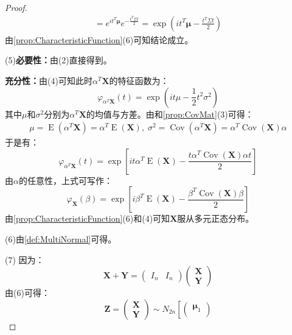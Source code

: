 \begin{proof}
\begin{align*}
		=e^{it^T\boldsymbol{\mu}}e^{-\frac{t^T\Sigma t}{2}}
		=\exp\left(it^T\boldsymbol{\mu}-\frac{t^T\Sigma t}{2}\right)
	\end{align*}
	由\cref{prop:CharacteristicFunction}(6)可知结论成立。\par
	(5)\textbf{必要性：}由(2)直接得到。\par
	\textbf{充分性：}由(4)可知此时$\alpha^T\mathbf{X}$的特征函数为：
	\begin{equation*}
		\varphi_{\alpha^T\mathbf{X}}(t)=\exp\left(it\mu-\frac{1}{2}t^2\sigma^2\right)
	\end{equation*}
	其中$\mu$和$\sigma^2$分别为$\alpha^T\mathbf{X}$的均值与方差。由和\cref{prop:CovMat}(3)可得：
	\begin{gather*}
		\mu=\operatorname{E}(\alpha^T\mathbf{X})=\alpha^T\operatorname{E}(\mathbf{X}),\;
		\sigma^2=\operatorname{Cov}(\alpha^T\mathbf{X})=\alpha^T\operatorname{Cov}(\mathbf{X})\alpha
	\end{gather*}
	于是有：
	\begin{equation*}
		\varphi_{\alpha^T\mathbf{X}}(t)=\exp\left[it\alpha^T\operatorname{E}(\mathbf{X})-\frac{t\alpha^T\operatorname{Cov}(\mathbf{X})\alpha t}{2}\right]
	\end{equation*}
	由$\alpha$的任意性，上式可写作：
	\begin{equation*}
		\varphi_{\mathbf{X}}(\beta)=\exp\left[i\beta^T\operatorname{E}(\mathbf{X})-\frac{\beta^T\operatorname{Cov}(\mathbf{X})\beta}{2}\right]
	\end{equation*}
	由\cref{prop:CharacteristicFunction}(6)和(4)可知$\mathbf{X}$服从多元正态分布。\par
	(6)由\cref{def:MultiNormal}可得。\par
	(7)	因为：
	\begin{equation*}
		\mathbf{X}+\mathbf{Y}=
		\begin{pmatrix}
			I_n & I_n
		\end{pmatrix}
		\begin{pmatrix}
			\mathbf{X} \\
			\mathbf{Y}
		\end{pmatrix}
	\end{equation*}
	由(6)可得：
	\begin{equation*}
		\mathbf{Z}=
		\begin{pmatrix}
			\mathbf{X} \\
			\mathbf{Y}
		\end{pmatrix}
		\sim N_{2n}\left[
		\begin{pmatrix}
			\boldsymbol{\mu}_1 \\

\end{pmatrix}
\end{equation*}
\end{proof}

